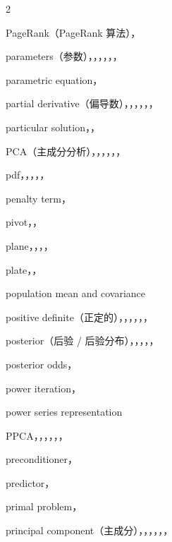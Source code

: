 \begin{multicols}{2}
\medskip{}\par\smallskip
\noindent PageRank（PageRank 算法），\par
\noindent parameters（参数），，，，，，\par
\noindent parametric equation，\par
\noindent partial derivative（偏导数），，，，，，\par
\noindent particular solution，，\par
\noindent PCA（主成分分析），，，，，，\par
\noindent pdf，，，，，\par
\noindent penalty term，\par
\noindent pivot，，\par
\noindent plane，，，，\par
\noindent plate，，\par
\noindent population mean and covariance\par
\noindent positive definite（正定的），，，，，，\par
\noindent posterior（后验 / 后验分布），，，，，\par
\noindent posterior odds，\par
\noindent power iteration，\par
\noindent power series representation\par
\noindent PPCA，，，，，，\par
\noindent preconditioner，\par
\noindent predictor，\par
\noindent primal problem，\par
\noindent principal component（主成分），，，，，，\par

\end{multicols}

